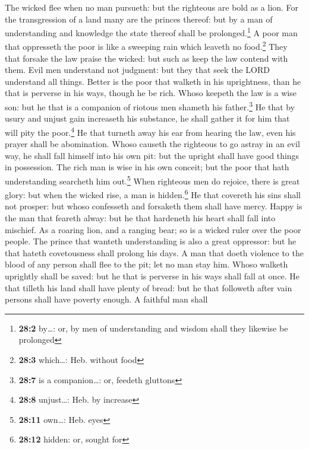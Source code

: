  The wicked flee when no man pursueth: but the righteous
are bold as a lion.  For the transgression of a land many
are the princes thereof: but by a man of understanding and knowledge the
state thereof shall be prolonged.\footnote{\textbf{28:2} by\ldots: or,
  by men of understanding and wisdom shall they likewise be prolonged}
 A poor man that oppresseth the poor is like a sweeping
rain which leaveth no food.\footnote{\textbf{28:3} which\ldots: Heb.
  without food}  They that forsake the law praise the
wicked: but such as keep the law contend with them.  Evil
men understand not judgment: but they that seek the LORD understand all
things.  Better is the poor that walketh in his
uprightness, than he that is perverse in his ways, though he be rich.
 Whoso keepeth the law is a wise son: but he that is a
companion of riotous men shameth his father.\footnote{\textbf{28:7} is a
  companion\ldots: or, feedeth gluttons}  He that by usury
and unjust gain increaseth his substance, he shall gather it for him
that will pity the poor.\footnote{\textbf{28:8} unjust\ldots: Heb. by
  increase}  He that turneth away his ear from hearing the
law, even his prayer shall be abomination.  Whoso causeth
the righteous to go astray in an evil way, he shall fall himself into
his own pit: but the upright shall have good things in possession.
 The rich man is wise in his own conceit; but the poor
that hath understanding searcheth him out.\footnote{\textbf{28:11}
  own\ldots: Heb. eyes}  When righteous men do rejoice,
there is great glory: but when the wicked rise, a man is
hidden.\footnote{\textbf{28:12} hidden: or, sought for} 
He that covereth his sins shall not prosper: but whoso confesseth and
forsaketh them shall have mercy.  Happy is the man that
feareth alway: but he that hardeneth his heart shall fall into mischief.
 As a roaring lion, and a ranging bear; so is a wicked
ruler over the poor people.  The prince that wanteth
understanding is also a great oppressor: but he that hateth covetousness
shall prolong his days.  A man that doeth violence to the
blood of any person shall flee to the pit; let no man stay him.
 Whoso walketh uprightly shall be saved: but he that is
perverse in his ways shall fall at once.  He that tilleth
his land shall have plenty of bread: but he that followeth after vain
persons shall have poverty enough.  A faithful man shall
